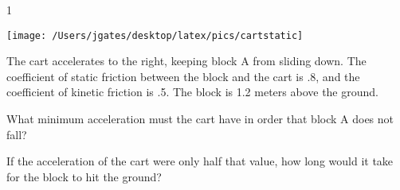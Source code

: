 
\AddToShipoutPicture*{\BackgroundPic}

\addtocounter {ProbNum} {1}

\begin{floatingfigure}[r]{.2\textwidth}
\texttt{[image: /Users/jgates/desktop/latex/pics/cartstatic]}
\end{floatingfigure}
 
{\bf \Large{}} The cart accelerates to the right, keeping block A from sliding down. The coefficient of static friction between the block and the cart is .8, and the coefficient of kinetic friction is .5. The block is 1.2 meters above the ground.

\bigskip
What minimum acceleration must the cart have in order that block A does not fall? 

\vfill
If the acceleration of the cart were only half that value, how long would it take for the block to hit the ground?

\vfill
\vfill
\newpage
